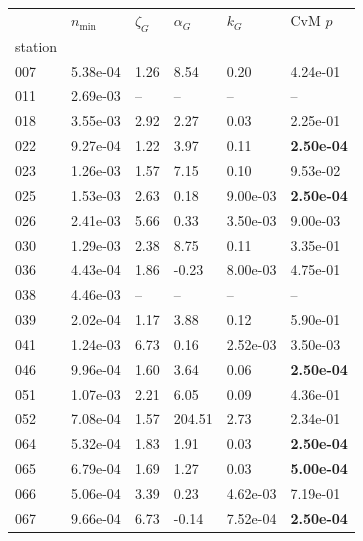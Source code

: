 \begin{figure}[htbp!]
    \centering
    {\footnotesize
    \begin{minipage}[t]{0.48\linewidth}
        \centering
        \begin{tabular}{llllll}
        \toprule
         & $n_{\min}$ & $\zeta_G$ & $\alpha_G$ & $k_G$ & CvM $p$ \\
        station &  &  &  &  &  \\
        \midrule
                    007 & 5.38e-04 & 1.26 & 8.54 & 0.20 & 4.24e-01\\
                    011 & 2.69e-03 & -- & -- & -- & --\\
                    018 & 3.55e-03 & 2.92 & 2.27 & 0.03 & 2.25e-01\\
                    022 & 9.27e-04 & 1.22 & 3.97 & 0.11 & \textbf{2.50e-04}\\
                    023 & 1.26e-03 & 1.57 & 7.15 & 0.10 & 9.53e-02\\
                    025 & 1.53e-03 & 2.63 & 0.18 & 9.00e-03 & \textbf{2.50e-04}\\
                    026 & 2.41e-03 & 5.66 & 0.33 & 3.50e-03 & 9.00e-03\\
                    030 & 1.29e-03 & 2.38 & 8.75 & 0.11 & 3.35e-01\\
                    036 & 4.43e-04 & 1.86 & -0.23 & 8.00e-03 & 4.75e-01\\
                    038 & 4.46e-03 & -- & -- & -- & --\\
                    039 & 2.02e-04 & 1.17 & 3.88 & 0.12 & 5.90e-01\\
                    041 & 1.24e-03 & 6.73 & 0.16 & 2.52e-03 & 3.50e-03\\
                    046 & 9.96e-04 & 1.60 & 3.64 & 0.06 & \textbf{2.50e-04}\\
                    051 & 1.07e-03 & 2.21 & 6.05 & 0.09 & 4.36e-01\\
                    052 & 7.08e-04 & 1.57 & 204.51 & 2.73 & 2.34e-01\\
                    064 & 5.32e-04 & 1.83 & 1.91 & 0.03 & \textbf{2.50e-04}\\
                    065 & 6.79e-04 & 1.69 & 1.27 & 0.03 & \textbf{5.00e-04}\\
                    066 & 5.06e-04 & 3.39 & 0.23 & 4.62e-03 & 7.19e-01\\
                    067 & 9.66e-04 & 6.73 & -0.14 & 7.52e-04 & \textbf{2.50e-04}\\

\end{tabular}
\end{minipage}}
\end{figure}
